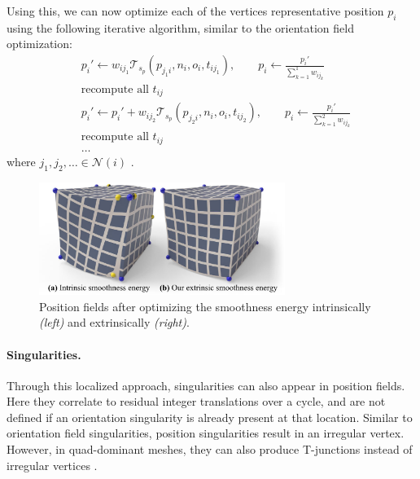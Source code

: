 \documentclass{ACGSeminar}
\begin{document}
Using this, we can now optimize each of the vertices representative position $p_i$ using the following iterative algorithm, similar to the orientation field optimization:
\begin{equation*}
\begin{split}
	& p_i' \leftarrow w_{ij_1} \mathcal{T}_{s_p}(p_{j_1i}, n_i, o_i, t_{ij_1}), \qquad p_i \leftarrow \frac{p_i'}{\sum_{k=1}^1 w_{ij_k}} \\
	& \textrm{recompute all } t_{ij}\\
	& p_i' \leftarrow p_i' + w_{ij_2} \mathcal{T}_{s_p}(p_{j_2i}, n_i, o_i, t_{ij_2}), \qquad p_i \leftarrow \frac{p_i'}{\sum_{k=1}^2 w_{ij_k}} \\
	& \textrm{recompute all } t_{ij}\\
	& \dots
\end{split}
\end{equation*}
where $j_1, j_2, \dots \in \mathcal{N}(i)$ \cite{jakob2015instant}.

\begin{figure}[htb!]
	\begin{centering}
		\includegraphics[width=8cm]{img/position-field-illustration.png}\par
	\end{centering}
	\caption{Position fields after optimizing the smoothness energy intrinsically \textit{(left)} and extrinsically \textit{(right)}. \cite{jakob2015instant}}
	\label{fig:position-field-illustration}
\end{figure}

\paragraph{Singularities.}
Through this localized approach, singularities can also appear in position fields. Here they correlate to residual integer translations over a cycle, and are not defined if an orientation singularity is already present at that location. Similar to orientation field singularities, position singularities result in an irregular vertex. However, in quad-dominant meshes, they can also produce T-junctions instead of irregular vertices \cite{jakob2015instant}.
\end{document}
